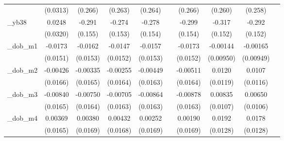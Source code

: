 \begin{table}[htbp]
\begin{tabular}{l*{9}{c}}
            &    (0.0313)         &     (0.266)         &     (0.263)         &     (0.264)         &                     &     (0.266)         &     (0.260)         &     (0.258)         &                     \\
[1em]
\_yb38       &      0.0248         &      -0.291\sym{*}  &      -0.274\sym{*}  &      -0.278\sym{*}  &                     &      -0.299\sym{*}  &      -0.317\sym{**} &      -0.292\sym{*}  &                     \\
            &    (0.0320)         &     (0.155)         &     (0.153)         &     (0.154)         &                     &     (0.154)         &     (0.152)         &     (0.152)         &                     \\
[1em]
\_dob\_m1     &     -0.0173         &     -0.0162         &     -0.0147         &     -0.0157         &                     &     -0.0173         &    -0.00144         &    -0.00165         &                     \\
            &    (0.0151)         &    (0.0153)         &    (0.0152)         &    (0.0153)         &                     &    (0.0152)         &   (0.00950)         &   (0.00949)         &                     \\
[1em]
\_dob\_m2     &    -0.00426         &    -0.00335         &    -0.00255         &    -0.00449         &                     &    -0.00511         &      0.0120         &      0.0107         &                     \\
            &    (0.0166)         &    (0.0165)         &    (0.0164)         &    (0.0163)         &                     &    (0.0164)         &    (0.0119)         &    (0.0116)         &                     \\
[1em]
\_dob\_m3     &    -0.00840         &    -0.00750         &    -0.00705         &    -0.00864         &                     &    -0.00878         &     0.00835         &     0.00650         &                     \\
            &    (0.0165)         &    (0.0164)         &    (0.0163)         &    (0.0163)         &                     &    (0.0163)         &    (0.0107)         &    (0.0106)         &                     \\
[1em]
\_dob\_m4     &     0.00369         &     0.00380         &     0.00432         &     0.00252         &                     &     0.00190         &      0.0192         &      0.0178         &                     \\
            &    (0.0165)         &    (0.0169)         &    (0.0168)         &    (0.0169)         &                     &    (0.0169)         &    (0.0128)         &    (0.0128)         &                     \\

\end{tabular}
\end{table}
